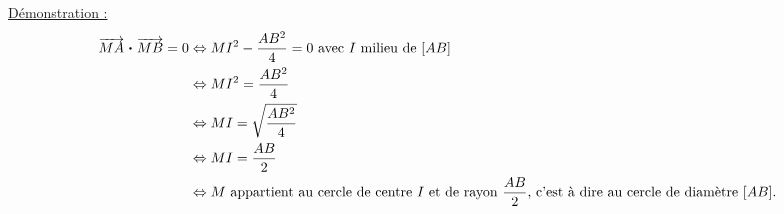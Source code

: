 \documentclass[11pt,a4paper]{article}
\newcommand{\pdt}{\mathbin{\vcenter{\hbox{\scalebox{0.6}{\textbullet}}}}}
\begin{document}
\underline{Démonstration :}
\begin{align*}
    \overrightarrow{MA}\pdt\overrightarrow{MB}=0&\Leftrightarrow MI^2-\frac{AB^2}{4}=0 \text{ avec $I$ milieu de $[AB]$} \\
    &\Leftrightarrow MI^2=\frac{AB^2}{4} \\
    &\Leftrightarrow MI = \sqrt{\frac{AB^2}{4}} \\
    &\Leftrightarrow MI = \frac{AB}{2} \\
    &\Leftrightarrow M \text{ appartient au cercle de centre $I$ et de rayon $\frac{AB}{2}$, c'est à dire au cercle de diamètre $[AB]$.} \\
\end{align*}
\end{document}
